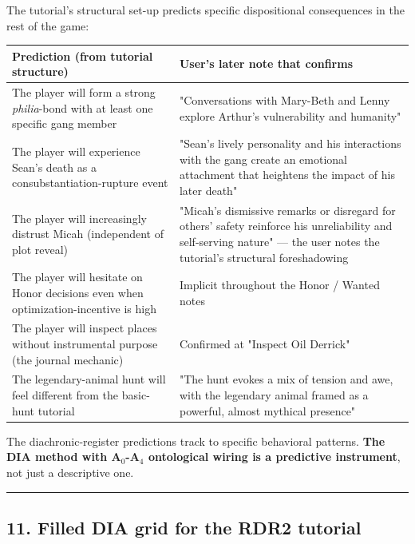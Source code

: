 \documentclass[11pt]{report}
\begin{document}
The tutorial's structural set-up predicts specific dispositional consequences in the rest of the game:


\begin{table}[H]
\renewcommand{\arraystretch}{1.25}
\begin{tabularx}{\textwidth}{>{\RaggedRight\arraybackslash}X>{\RaggedRight\arraybackslash}X}
\toprule
Prediction (from tutorial structure) & User's later note that confirms \\
\midrule
The player will form a strong \textit{philia}-bond with at least one specific gang member & "Conversations with Mary-Beth and Lenny explore Arthur's vulnerability and humanity" \\
The player will experience Sean's death as a consubstantiation-rupture event & "Sean's lively personality and his interactions with the gang create an emotional attachment that heightens the impact of his later death" \\
The player will increasingly distrust Micah (independent of plot reveal) & "Micah's dismissive remarks or disregard for others' safety reinforce his unreliability and self-serving nature" — the user notes the tutorial's structural foreshadowing \\
The player will hesitate on Honor decisions even when optimization-incentive is high & Implicit throughout the Honor / Wanted notes \\
The player will inspect places without instrumental purpose (the journal mechanic) & Confirmed at "Inspect Oil Derrick" \\
The legendary-animal hunt will feel different from the basic-hunt tutorial & "The hunt evokes a mix of tension and awe, with the legendary animal framed as a powerful, almost mythical presence" \\
\bottomrule
\end{tabularx}
\end{table}


The diachronic-register predictions track to specific behavioral patterns. \textbf{The DIA method with A$_0$-A$_4$ ontological wiring is a predictive instrument}, not just a descriptive one.


\vspace{0.4em}\hrule\vspace{0.8em}


\subsection{11. Filled DIA grid for the RDR2 tutorial}
\end{document}
